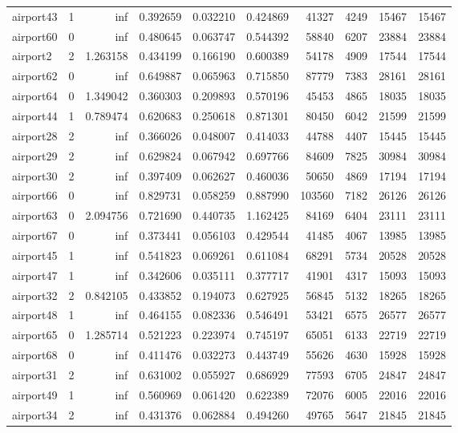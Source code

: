 \begin{longtable}{|l|r|r|r|r|r|r|r|r|r|}
airport43 & 1 & inf & 0.392659 & 0.032210 & 0.424869 & 41327 & 4249 & 15467 & 15467 \\
airport60 & 0 & inf & 0.480645 & 0.063747 & 0.544392 & 58840 & 6207 & 23884 & 23884 \\
airport2 & 2 & 1.263158 & 0.434199 & 0.166190 & 0.600389 & 54178 & 4909 & 17544 & 17544 \\
airport62 & 0 & inf & 0.649887 & 0.065963 & 0.715850 & 87779 & 7383 & 28161 & 28161 \\
airport64 & 0 & 1.349042 & 0.360303 & 0.209893 & 0.570196 & 45453 & 4865 & 18035 & 18035 \\
airport44 & 1 & 0.789474 & 0.620683 & 0.250618 & 0.871301 & 80450 & 6042 & 21599 & 21599 \\
airport28 & 2 & inf & 0.366026 & 0.048007 & 0.414033 & 44788 & 4407 & 15445 & 15445 \\
airport29 & 2 & inf & 0.629824 & 0.067942 & 0.697766 & 84609 & 7825 & 30984 & 30984 \\
airport30 & 2 & inf & 0.397409 & 0.062627 & 0.460036 & 50650 & 4869 & 17194 & 17194 \\
airport66 & 0 & inf & 0.829731 & 0.058259 & 0.887990 & 103560 & 7182 & 26126 & 26126 \\
airport63 & 0 & 2.094756 & 0.721690 & 0.440735 & 1.162425 & 84169 & 6404 & 23111 & 23111 \\
airport67 & 0 & inf & 0.373441 & 0.056103 & 0.429544 & 41485 & 4067 & 13985 & 13985 \\
airport45 & 1 & inf & 0.541823 & 0.069261 & 0.611084 & 68291 & 5734 & 20528 & 20528 \\
airport47 & 1 & inf & 0.342606 & 0.035111 & 0.377717 & 41901 & 4317 & 15093 & 15093 \\
airport32 & 2 & 0.842105 & 0.433852 & 0.194073 & 0.627925 & 56845 & 5132 & 18265 & 18265 \\
airport48 & 1 & inf & 0.464155 & 0.082336 & 0.546491 & 53421 & 6575 & 26577 & 26577 \\
airport65 & 0 & 1.285714 & 0.521223 & 0.223974 & 0.745197 & 65051 & 6133 & 22719 & 22719 \\
airport68 & 0 & inf & 0.411476 & 0.032273 & 0.443749 & 55626 & 4630 & 15928 & 15928 \\
airport31 & 2 & inf & 0.631002 & 0.055927 & 0.686929 & 77593 & 6705 & 24847 & 24847 \\
airport49 & 1 & inf & 0.560969 & 0.061420 & 0.622389 & 72076 & 6005 & 22016 & 22016 \\
airport34 & 2 & inf & 0.431376 & 0.062884 & 0.494260 & 49765 & 5647 & 21845 & 21845 \\

\end{longtable}
